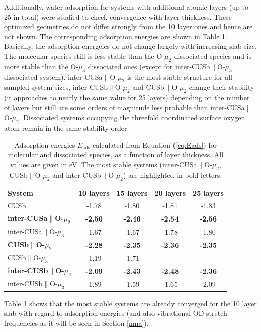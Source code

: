 \documentclass[11pt,DIV=13,BCOR=5mm,a4paper,headinclude]{scrbook}
\begin{document}
Additionally, water adsorption for systems with additional atomic layers (up to 25 in total) were studied to check convergence with layer thickness.
These optimized geometries do not differ strongly from the 10 layer ones and hence are not shown.
The corresponding adsorption energies are shown in Table \ref{tab:eads_layers}.
Basically, the adsorption energeies do not change largely with increasing slab size.
The molecular species still is less stable than the O-$\mu_2$ dissociated species and is more stable than the O-$\mu_3$ dissociated ones (except for inter-CUSb$\parallel$O-$\mu_3$ dissociated system).
inter-CUSa$\parallel$O-$\mu_2$ is the most stable structure for all sampled system sizes, inter-CUSb$\parallel$O-$\mu_2$ and CUSb$\parallel$O-$\mu_2$ change their stability (it approaches to nearly the same value for 25 layers) depending on the number of layers but still are some orders of magnitude less probable than inter-CUSa$\parallel$O-$\mu_2$.
Dissociated systems occupying the threefold coordinated surface oxygen atom remain in the same stability order.
\begin{table}[!ht]
  \centering
  \caption{Adsorption energies $E_\textrm{ads}$ calculated from Equation (\ref{eq:Eads}) for molecular and dissociated species, as a function of layer thickness.
All values are given in eV.
The most stable systems (inter-CUSa$\parallel$O-$\mu_2$, CUSb$\parallel$O-$\mu_2$ and inter-CUSb$\parallel$O-$\mu_2$) are highlighted in bold letters.}
 \begin{tabular}{l|cccc}
 \toprule
 System                     & 10 layers& 15 layers& 20 layers& 25 layers \\\midrule
CUSb                                    &-1.78 &-1.80     &-1.81     &-1.83      \\\hline
\textbf{inter-CUSa$\parallel$O-$\mu_2$}    &\textbf{-2.50} &\textbf{-2.46} &\textbf{-2.54} &\textbf{-2.56}  \\
inter-CUSa$\parallel$O-$\mu_3$          &-1.67 &-1.67 &-1.78 &-1.80 \\
\textbf{CUSb$\parallel$O-$\mu_2$}          &\textbf{-2.28} &\textbf{-2.35} &\textbf{-2.36} &\textbf{-2.35} \\
CUSb$\parallel$O-$\mu_3$                &-1.19 &-1.71 &-     &-      \\
\textbf{inter-CUSb$\parallel$O-$\mu_2$}    &\textbf{-2.09} &\textbf{-2.43} &\textbf{-2.48} &\textbf{-2.36}  \\
inter-CUSb$\parallel$O-$\mu_3$          &-1.89 &-1.59 &-1.65 &-2.09 \\\bottomrule
\end{tabular}
\label{tab:eads_layers}
\end{table}
Table \ref{tab:eads_layers} shows that the most stable systems are already converged for the 10 layer slab with regard to adsorption energies (and also vibrational OD stretch frequencies as it will be seen in Section \ref{nma}).
\end{document}

